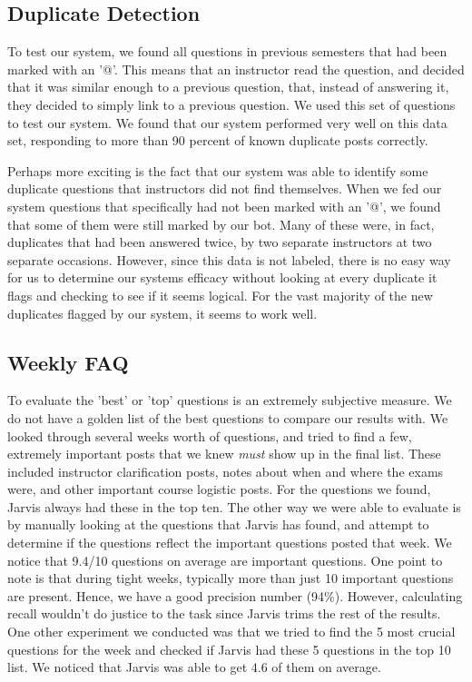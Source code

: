 \documentclass[sigconf]{acmart}
\begin{document}
\subsection{Duplicate Detection}
To test our system, we found all questions in previous semesters that had been marked with an '@'. This means that an instructor read the question, and decided that it was similar enough to a previous question, that, instead of answering it, they decided to simply link to a previous question. We used this set of questions to test our system. We found that our system performed very well on this data set, responding to more than 90 percent of known duplicate posts correctly.

Perhaps more exciting is the fact that our system was able to identify some duplicate questions that instructors did not find themselves. When we fed our system questions that specifically had not been marked with an '@', we found that some of them were still marked by our bot. Many of these were, in fact, duplicates that had been answered twice, by two separate instructors at two separate occasions. However, since this data is not labeled, there is no easy way for us to determine our systems efficacy without looking at every duplicate it flags and checking to see if it seems logical. For the vast majority of the new duplicates flagged by our system, it seems to work well.

\subsection{Weekly FAQ}

To evaluate the 'best' or 'top' questions is an extremely subjective measure. We do not have a golden list of the best questions to compare our results with. We looked through several weeks worth of questions, and tried to find a few, extremely important posts that we knew \textit{must} show up in the final list. These included instructor clarification posts, notes about when and where the exams were, and other important course logistic posts. For the questions we found, Jarvis always had these in the top ten. The other way we were able to evaluate is by manually looking at the questions that Jarvis has found, and attempt to determine if the questions reflect the important questions posted that week. We notice that 9.4/10 questions on average are important questions. One point to note is that during tight weeks, typically more than just 10 important questions are present. Hence, we have a good precision number (94\%). However, calculating recall wouldn't do justice to the task since Jarvis trims the rest of the results. One other experiment we conducted was that we tried to find the 5 most crucial questions for the week and checked if Jarvis had these 5 questions in the top 10 list. We noticed that Jarvis was able to get 4.6 of them on average.
\end{document}

